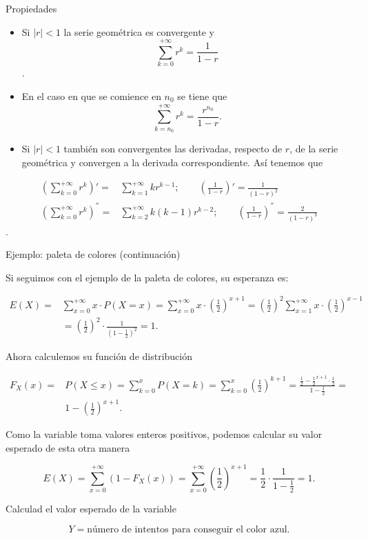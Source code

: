 \documentclass[
  letterpaper,
  DIV=11,
  numbers=noendperiod]{scrreprt}
\begin{document}
\begin{Proposicion}{Propiedades}{}

\begin{itemize}
\item
  Si \(|r|<1\) la serie geométrica es convergente y
  \[\sum_{k=0}^{+\infty }
  r^k=\frac1{1-r}\].
\item
  En el caso en que se comience en \(n_0\) se tiene que
  \[\sum_{k=n_0}^{+\infty} r^k=\frac{r^{n_0}}{1-r}.\]
\item
  Si \(|r|<1\) también son convergentes las derivadas, respecto de
  \(r\), de la serie geométrica y convergen a la derivada
  correspondiente. Así tenemos que
\end{itemize}

\begin{align*}
\left(\sum_{k=0}^{+\infty} r^k\right)'= & \sum_{k=1}^{+\infty}k
r^{k-1}; \qquad  \left(\frac1{1-r}\right)'=\frac1{(1-r)^2}\\
\left(\sum_{k=0}^{+\infty} r^k\right)^{''}=&\sum_{k=2}^{+\infty}k (k-1)
r^{k-2}  ;\qquad  \left(\frac1{1-r}\right)^{''}=\frac2{(1-r)^3}
\end{align*}.

\end{Proposicion}

\begin{Ejemplo}{Ejemplo: paleta de colores (continuación)}{}

Si seguimos con el ejemplo de la paleta de colores, su esperanza es:

\begin{align*}
E(X)= & \sum_{x=0}^{+\infty} x\cdot  P(X=x)=\sum_{x=0}^{+\infty} x\cdot
\left(\frac12\right)^{x+1}=  \left(\frac12\right)^2\sum_{x=1}^{+\infty} x\cdot
\left(\frac12\right)^{x-1}\\ & =\left(\frac12\right)^2\cdot
\frac1{\left(1-\frac12\right)^2}=1.
\end{align*}

Ahora calculemos su función de distribución

\begin{align*}
F_X(x)= &  P(X\leq x)=\sum_{k=0}^x P(X=k)=\sum_{k=0}^x
\left(\frac12\right)^{k+1}= \frac{\frac12-\frac12^{x+1}\cdot
\frac12}{1-\frac12}=\\ & 1-\left(\frac12\right)^{x+1}.
\end{align*}

Como la variable toma valores enteros positivos, podemos calcular su
valor esperado de esta otra manera

\[E(X)=\sum_{x=0}^{+\infty} (1-F_X(x))=\sum_{x=0}^{+\infty}\left(\frac12\right)^{x+1}=\frac12\cdot 
\frac1{1-\frac12}=1.\]

Calculad el valor esperado de la variable

\[
Y=\mbox{número de intentos para conseguir el color azul.}
\]

\end{Ejemplo}
\end{document}
